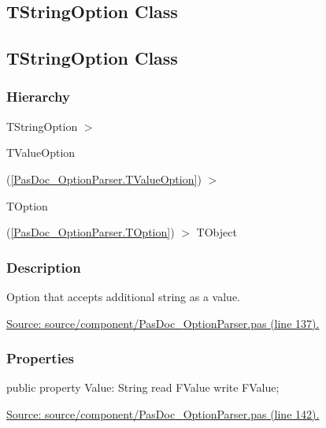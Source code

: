 \documentclass{report}
\newif\ifpdf
\begin{document}
\subsection*{\large{\textbf{TStringOption Class}}\normalsize\hspace{1ex}\hrulefill}
\else
\subsection*{TStringOption Class}
\fi
\label{PasDoc_OptionParser.TStringOption}
\subsubsection*{\large{\textbf{Hierarchy}}\normalsize\hspace{1ex}\hfill}
TStringOption {$>$} \begin{ttfamily}TValueOption\end{ttfamily}(\ref{PasDoc_OptionParser.TValueOption}) {$>$} \begin{ttfamily}TOption\end{ttfamily}(\ref{PasDoc_OptionParser.TOption}) {$>$} 
TObject
\subsubsection*{\large{\textbf{Description}}\normalsize\hspace{1ex}\hfill}
Option that accepts additional string as a value.\par
\href{https://github.com/pasdoc/pasdoc/blob/master/source/component/PasDoc_OptionParser.pas#L137}{Source: source/component/PasDoc{\_}OptionParser.pas (line 137).}\subsubsection*{\large{\textbf{Properties}}\normalsize\hspace{1ex}\hfill}
\begin{list}{}{
\setlength{\itemindent}{0cm}
\setlength{\listparindent}{0cm}
\setlength{\leftmargin}{\evensidemargin}
\addtolength{\leftmargin}{\tmplength}
\settowidth{\labelsep}{X}
\addtolength{\leftmargin}{\labelsep}
\setlength{\labelwidth}{\tmplength}
}
\label{PasDoc_OptionParser.TStringOption-Value}
\item[\textbf{Value}\hfill]
\ifpdf
\begin{flushleft}
\fi
\begin{ttfamily}
public property Value: String read FValue write FValue;\end{ttfamily}

\ifpdf
\end{flushleft}
\fi


\par  \par
\href{https://github.com/pasdoc/pasdoc/blob/master/source/component/PasDoc_OptionParser.pas#L142}{Source: source/component/PasDoc{\_}OptionParser.pas (line 142).}\end{list}
\end{document}
